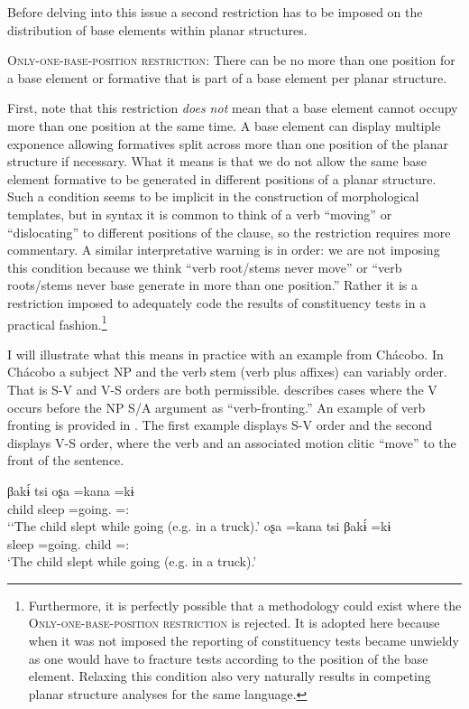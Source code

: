 \documentclass[output=paper,hidelinks]{langscibook}
\begin{document}
Before delving into this issue a second restriction has to be imposed on the distribution of base elements within planar structures.

\ea 
    \textsc{Only-one-base-position restriction}: There can be no more than one position for a base element or formative that is part of a base element per planar structure.
\z 

First, note that this restriction \textit{does not} mean that a base element cannot occupy more than one position at the same time. A base element can display multiple exponence allowing formatives split across more than one position of the planar structure if necessary. What it means is that we do not allow the same base element formative to be generated in different positions of a planar structure. Such a condition seems to be implicit in the construction of morphological templates, but in syntax it is common to think of a verb ``moving'' or ``dislocating'' to different positions of the clause, so the restriction requires more commentary. A similar interpretative warning is in order: we are not imposing this condition because we think ``verb root/stems never move'' or ``verb roots/stems never base generate in more than one position.'' Rather it is a restriction imposed to adequately code the results of constituency tests in a practical fashion.\footnote{Furthermore, it is perfectly possible that a methodology could exist where the \textsc{Only-one-base-position restriction} is rejected. It is adopted here because when it was not imposed the reporting of constituency tests became unwieldy as one would have to fracture tests according to the position of the base element. Relaxing this condition also very naturally results in competing planar structure analyses for the same language.}

I will illustrate what this means in practice with an example from Chácobo. In Chácobo a subject NP and the verb stem (verb plus affixes) can variably order. That is S-V and V-S orders are both permissible. \citet{tallman2018grammar} describes cases where the V occurs before the NP S/A argument as ``verb-fronting.'' An example of verb fronting is provided in . The first example displays S-V order and the second displays V-S order, where the verb and an associated motion clitic ``move'' to the front of the sentence.

\ea \label{ex:chacobowackernagel}
    \ea  \label{ex:chacobowackernagel1}
    \gll βakɨ́ tsi oʂa =kana =kɨ \\
        child \Lnk{} sleep =going.\Itr{} \Lnk{} =\Decl{}:\Pst{} \\
        `\glt `The child slept while going (e.g. in a truck).'
    \ex \label{ex:chacobowackernagel2}
    \gll oʂa =kana tsi βakɨ́ =kɨ \\
        sleep =going.\Itr{} \Lnk{} child =\Decl{}:\Pst{}   \\
        \glt  `The child slept while going (e.g. in a truck).'
    \z 
\z 
\end{document}
